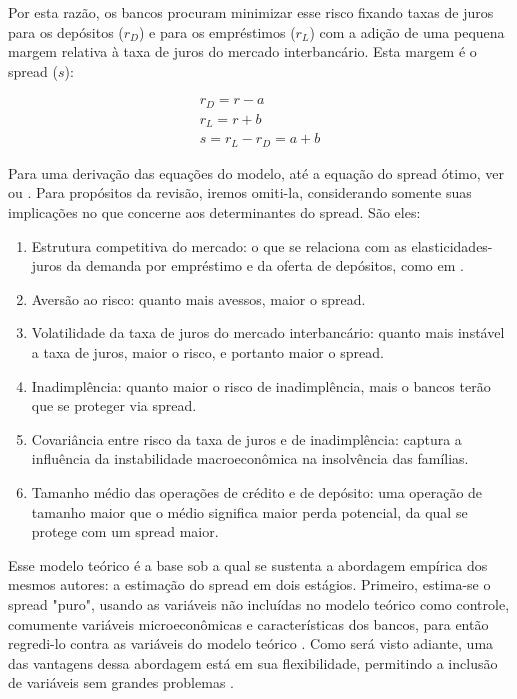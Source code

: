 \documentclass[a4paper, article, 12pt, openany, oneside, english, brazil]{abntex2}
\begin{document}
    Por esta razão, os bancos procuram minimizar esse risco fixando taxas de juros para os depósitos ($r_D$) e para os empréstimos ($r_L$) com a adição de uma pequena margem relativa à taxa de juros do mercado interbancário. Esta margem é o spread ($s$):

	\begin{gather}
		r_D = r - a \\
		r_L = r + b \\
		s = r_L - r_D = a + b
	\end{gather}

    Para uma derivação das equações do modelo, até a equação do spread ótimo, ver  ou . Para propósitos da revisão, iremos omiti-la, considerando somente suas implicações no que concerne aos determinantes do spread. São eles:

	\begin{enumerate}
		\item Estrutura competitiva do mercado: o que se relaciona com as elasticidades-juros da demanda por empréstimo e da oferta de depósitos, como em .
		\item Aversão ao risco: quanto mais avessos, maior o spread.
		\item Volatilidade da taxa de juros do mercado interbancário: quanto mais instável a taxa de juros, maior o risco, e portanto maior o spread.
		\item Inadimplência: quanto maior o risco de inadimplência, mais o bancos terão que se proteger via spread.
		\item Covariância entre risco da taxa de juros e de inadimplência: captura a influência da instabilidade macroeconômica na insolvência das famílias. \cite{oreiro}
		\item Tamanho médio das operações de crédito e de depósito: uma operação de tamanho maior que o médio significa maior perda potencial, da qual se protege com um spread maior.
	\end{enumerate}

    Esse modelo teórico é a base sob a qual se sustenta a abordagem empírica dos mesmos autores: a estimação do spread em dois estágios. Primeiro, estima-se o spread "puro", usando as variáveis não incluídas no modelo teórico como controle, comumente variáveis microeconômicas e características dos bancos, para então regredi-lo contra as variáveis do modelo teórico . Como será visto adiante, uma das vantagens dessa abordagem está em sua flexibilidade, permitindo a inclusão de variáveis sem grandes problemas .
\end{document}
